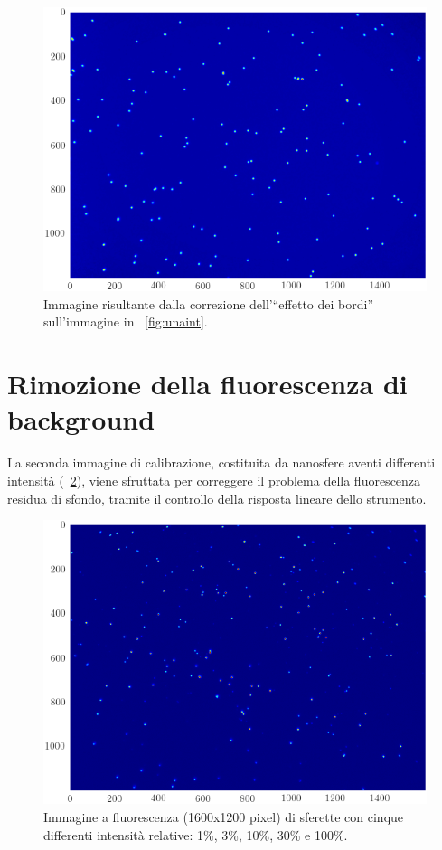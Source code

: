 \begin{figure}
 \centering
 \includegraphics[scale=.64]{img/CAP3unaintcorr.png}
 \caption{\small{Immagine risultante dalla correzione dell'``effetto dei bordi'' sull'immagine in \figurename~\ref{fig:unaint}.}}
 \label{fig:unaintcorr}
\end{figure}



\section{Rimozione della fluorescenza di background}

La seconda immagine di calibrazione, costituita da nanosfere aventi differenti intensità (\figurename~\ref{fig:piuint}), viene sfruttata per correggere il problema della fluorescenza residua di sfondo, tramite il controllo della risposta lineare dello strumento. 

\begin{figure}
 \centering
 \includegraphics[scale=.64]{img/CAP3piuint.png}
 \caption{\small{Immagine a fluorescenza (1600x1200 pixel) di sferette con cinque differenti intensità relative: 1\%, 3\%, 10\%, 30\% e 100\%.}}
 \label{fig:piuint}
\end{figure}


